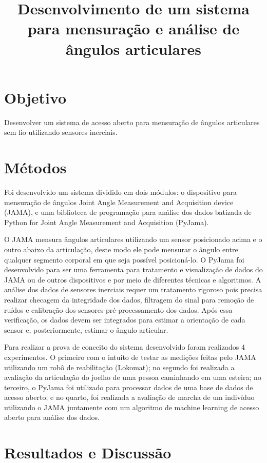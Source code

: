 \documentclass{article}
\title{Desenvolvimento de um sistema para mensuração e análise
de ângulos articulares}
\author{}
\date{}
\begin{document}
\maketitle

\section{Objetivo}
Desenvolver um sistema de acesso aberto para mensuração de ângulos articulares sem fio utilizando sensores inerciais.

\section{Métodos}
Foi desenvolvido um sistema dividido em dois módulos: o dispositivo para mensuração de ângulos Joint Angle Measurement and Acquisition device (JAMA), e uma biblioteca de programação para análise dos dados batizada de Python for Joint Angle Measurement and Acquisition (PyJama).

O JAMA mensura ângulos articulares utilizando um sensor posicionado acima e o outro abaixo da articulação, deste modo ele pode mensurar o ângulo entre qualquer segmento corporal em que seja possível posicioná-lo. O PyJama foi desenvolvido para ser uma ferramenta para tratamento e visualização de dados do JAMA ou de outros dispositivos e por meio de diferentes técnicas e algoritmos. A análise dos dados de sensores inerciais requer um tratamento rigoroso pois precisa realizar checagem da integridade dos dados, filtragem do sinal para remoção de ruídos e calibração dos sensores-pré-processamento dos dados. Após essa verificação, os dados devem ser integrados para estimar a orientação de cada sensor e, posteriormente, estimar o ângulo articular. 

Para realizar a prova de conceito do sistema desenvolvido foram realizados 4 experimentos. O primeiro com o intuito de testar as medições feitas pelo JAMA utilizando um robô de reabilitação (Lokomat); no segundo foi realizada a avaliação da articulação do joelho de uma pessoa caminhando em uma esteira; no terceiro, o PyJama foi utilizado para processar dados de uma base de dados de acesso aberto; e no quarto, foi realizada a avaliação de marcha de um indivíduo utilizando o JAMA juntamente com um algoritmo de machine learning de acesso aberto para análise dos dados.

\section{Resultados e Discussão}
\end{document}
